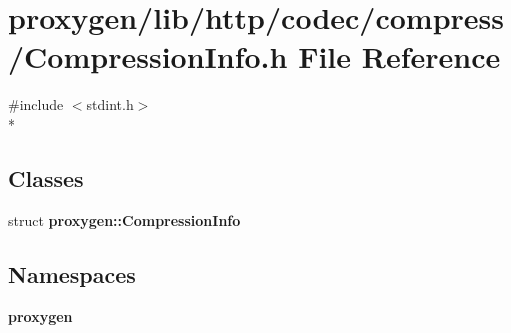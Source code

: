 \section{proxygen/lib/http/codec/compress/\+Compression\+Info.h File Reference}
\label{CompressionInfo_8h}
{\ttfamily \#include $<$stdint.\+h$>$}\\*
\subsection*{Classes}
\begin{DoxyCompactItemize}
\item 
struct {\bf proxygen\+::\+Compression\+Info}
\end{DoxyCompactItemize}
\subsection*{Namespaces}
\begin{DoxyCompactItemize}
\item 
 {\bf proxygen}
\end{DoxyCompactItemize}
